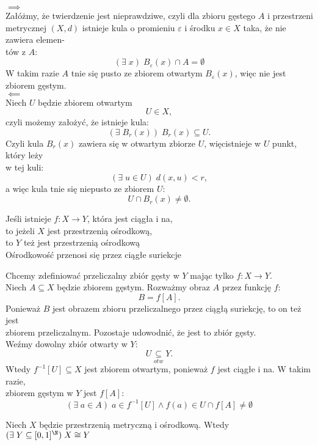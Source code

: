 \dowod
$\implies$\medskip\\
Załóżmy, że twierdzenie jest nieprawdziwe, czyli dla zbioru gęstego $A$ i przestrzeni \\metrycznej $(X, d)$ istnieje kula o promieniu $\varepsilon$ i środku $x\in X$ taka, że nie zawiera elemen-\\tów z $A$:
$$(\exists\;x)\;B_\varepsilon(x)\cap A=\emptyset$$
W takim razie $A$ tnie się pusto ze zbiorem otwartym $B_\varepsilon(x)$, więc nie jest zbiorem gęstym.\bigskip\\
$\impliedby$\medskip\\
Niech $U$ będzie zbiorem otwartym
$$U\in X,$$
czyli możemy założyć, że istnieje kula:
$$(\exists\;B_r(x))\;B_r(x)\subseteq U.$$
Czyli kula $B_r(x)$ zawiera się w otwartym zbiorze $U$, więcistnieje w $U$ punkt, który leży \\w tej kuli:
$$(\exists\;u\in U)\;d(x,u)<r,$$
a więc kula tnie się niepusto ze zbiorem $U$:
$$U\cap B_r(x)\neq\emptyset.$$
\kondow
{}\bigskip
\begin{center}\large
    Jeśli istnieje $f:X\to Y$, która jest ciągła i na, \\to jeżeli $X$ jest przestrzenią ośrodkową, \\to $Y$ też jest przestrzenią ośrodkową\medskip\\
    Ośrodkowość {\color{def}przenosi się przez ciągłe suriekcje}
\end{center}\bigskip
\dowod
Chcemy zdefiniować przeliczalny zbiór gęsty w $Y$ mając tylko $f:X\to Y$.\medskip\\
Niech $A\subseteq X$ będzie zbiorem gęstym. Rozważmy obraz $A$ przez funkcję $f$:
$$B=f[A].$$
Ponieważ $B$ jest obrazem zbioru przeliczalnego przez ciągłą suriekcję, to on też jest \\zbiorem przeliczalnym. Pozostaje udowodnić, że jest to zbiór gęsty.\medskip\\
Weźmy dowolny zbiór otwarty w $Y$:
$$U\underset{otw}\subseteq Y.$$
Wtedy $f^{-1}[U]\subseteq X$ jest zbiorem otwartym, ponieważ $f$ jest ciągłe i na. W takim razie, \\zbiorem gęstym w $Y$ jest $f[A]$:
$$(\exists\;a\in A)\;a\in f^{-1}[U]\land f(a)\in U\cap f[A]\neq \emptyset$$
\kondow 
{}\bigskip
\begin{center}\large
    Niech $X$ będzie przestrzenią metryczną i ośrodkową. Wtedy \smallskip\\
    $(\exists\; Y\subseteq [0,1]^\N)\;X\cong Y$
\end{center}\bigskip
\dowod
